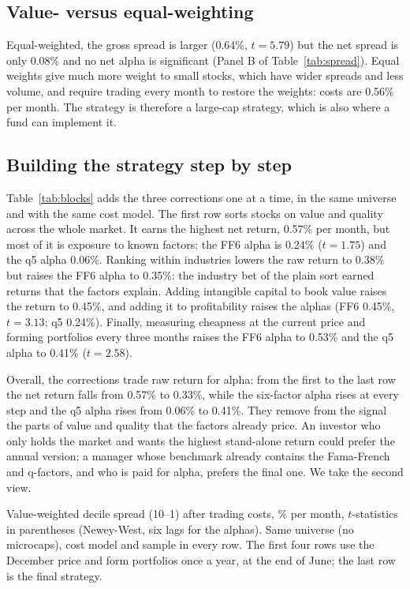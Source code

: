 \documentclass[12pt,a4paper]{article}
\newcommand{\tablenote}[1]{\par\vspace{4pt}\begin{minipage}{\linewidth}\footnotesize\singlespacing #1\end{minipage}}
\begin{document}
\subsection{Value- versus equal-weighting}

Equal-weighted, the gross spread is larger (0.64\%, $t=5.79$) but the net spread is only 0.08\% and
no net alpha is significant (Panel B of Table~\ref{tab:spread}). Equal weights give much more weight
to small stocks, which have wider spreads and less volume, and require trading every month to restore
the weights: costs are 0.56\% per month. The strategy is therefore a large-cap strategy, which is
also where a fund can implement it.

\subsection{Building the strategy step by step}

Table~\ref{tab:blocks} adds the three corrections one at a time, in the same universe and with the
same cost model. The first row sorts stocks on value and quality across the whole market. It earns
the highest net return, 0.57\% per month, but most of it is exposure to known factors: the FF6 alpha
is 0.24\% ($t=1.75$) and the q5 alpha 0.06\%. Ranking within industries lowers the raw return to
0.38\% but raises the FF6 alpha to 0.35\%: the industry bet of the plain sort earned returns that the
factors explain. Adding intangible capital to book value raises the return to 0.45\%, and adding it
to profitability raises the alphas (FF6 0.45\%, $t=3.13$; q5 0.24\%). Finally, measuring cheapness at
the current price and forming portfolios every three months raises the FF6 alpha to 0.53\% and the
q5 alpha to 0.41\% ($t=2.58$).

Overall, the corrections trade raw return for alpha: from the first to the last row the net return
falls from 0.57\% to 0.33\%, while the six-factor alpha rises at every step and the q5 alpha rises
from 0.06\% to 0.41\%. They remove from the signal the parts of value and quality that the factors
already price. An investor who only holds the market and wants the highest stand-alone return could
prefer the annual version; a manager whose benchmark already contains the Fama-French and q-factors,
and who is paid for alpha, prefers the final one. We take the second view.

\begin{table}[H]
\centering
\caption{Building the strategy one correction at a time, 1963--2015}\label{tab:blocks}
\resizebox{\textwidth}{!}{}
\tablenote{Value-weighted decile spread (10--1) after trading costs, \% per month, $t$-statistics in
parentheses (Newey-West, six lags for the alphas). Same universe (no microcaps), cost model and
sample in every row. The first four rows use the December price and form portfolios once a year, at
the end of June; the last row is the final strategy.}
\end{table}
\end{document}
